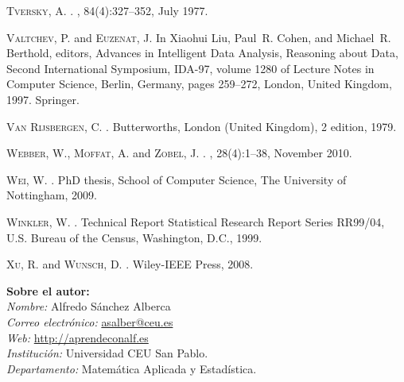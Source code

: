 \documentclass[a4paper,10pt,twoside]{article}
\theoremstyle{definition}
\begin{document}
\begin{thebibliography}{10}
\textsc{Tversky}, A.
.
, 84(4):327--352, July 1977.

\textsc{Valtchev}, P. and \textsc{Euzenat}, J.
\newblock In Xiaohui Liu, Paul~R. Cohen, and Michael~R. Berthold, editors, {
    {Advances in Intelligent Data Analysis, Reasoning about Data, Second
    International Symposium, IDA-97}}, volume 1280 of {{Lecture Notes in
    Computer Science, Berlin, Germany}}, pages 259--272, London, United Kingdom,
    1997. Springer.

\textsc{Van Rijsbergen}, C.
.
\newblock Butterworths, London (United Kingdom), 2 edition, 1979.

\textsc{Webber}, W., \textsc{Moffat}, A. and \textsc{Zobel}, J.
.
, 28(4):1--38, November
    2010.

\textsc{Wei}, W.
.
\newblock PhD thesis, School of Computer Science, The University of Nottingham,
    2009.

\textsc{Winkler}, W.
.
\newblock Technical Report Statistical Research Report Series RR99/04, U.S.
    Bureau of the Census, Washington, D.C., 1999.

\textsc{Xu}, R. and \textsc{Wunsch}, D.
.
\newblock Wiley-IEEE Press, 2008.

\end{thebibliography}
    

\vspace{1cm}
\noindent\textbf{Sobre el autor:}\\
\emph{Nombre:} Alfredo Sánchez Alberca\\
\emph{Correo electrónico:} \href{mailto:asalber@ceu.es}{asalber@ceu.es}\\
\emph{Web:} \url{http://aprendeconalf.es}\\
\emph{Institución:} Universidad CEU San Pablo.\\
\emph{Departamento:} Matemática Aplicada y Estadística.
\end{document}
